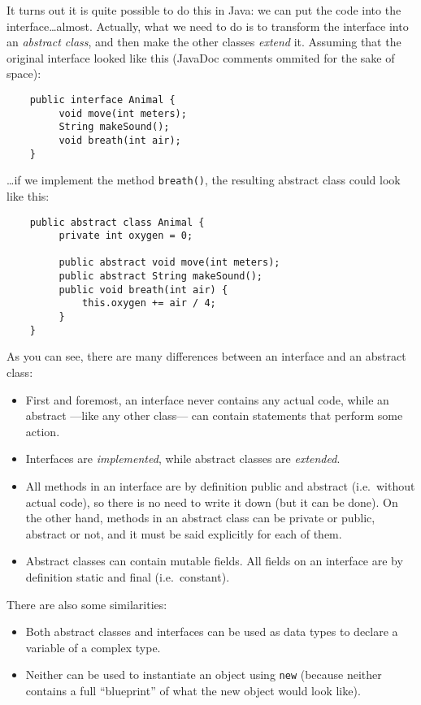 It turns out it is quite possible to do this in Java: we can put the
code into the interface\ldots almost. Actually, what we need to do is
to transform the interface into an \emph{abstract class}, and then
make the other classes \emph{extend} it. Assuming
that the original interface looked like this (JavaDoc comments ommited
for the sake of space):

\begin{verbatim}
    public interface Animal {
         void move(int meters);
         String makeSound();
         void breath(int air);
    }
\end{verbatim}

\ldots if we implement the method \verb+breath()+, the resulting
abstract class could look like this: 

\begin{verbatim}
    public abstract class Animal {
         private int oxygen = 0;

         public abstract void move(int meters);
         public abstract String makeSound();
         public void breath(int air) {
             this.oxygen += air / 4;
         }
    }        
\end{verbatim}

As you can see, there are many differences between an interface and an
abstract class: 

\begin{itemize}
\item First and foremost, an interface never contains any actual code,
  while an abstract ---like any other class--- can contain statements
  that perform some action.
\item Interfaces are \emph{implemented}, while abstract classes are
  \emph{extended}.
\item All methods in an interface are by definition public and
  abstract (i.e.~without actual code), so there is no need to write it
  down (but it can be done). On the other hand, methods in an abstract
  class can be private or public, abstract or not, and it must be said
  explicitly for each of them.
\item Abstract classes can contain mutable fields. All fields on an
  interface are by definition static and final (i.e.~constant).
\end{itemize}

There are also some similarities: 

\begin{itemize}
\item Both abstract classes and interfaces can be used as data
  types to declare a variable of a complex type.
\item Neither can be used to instantiate an object using \verb+new+
  (because neither contains a full ``blueprint'' of what the new
  object would look like). 
\end{itemize}

